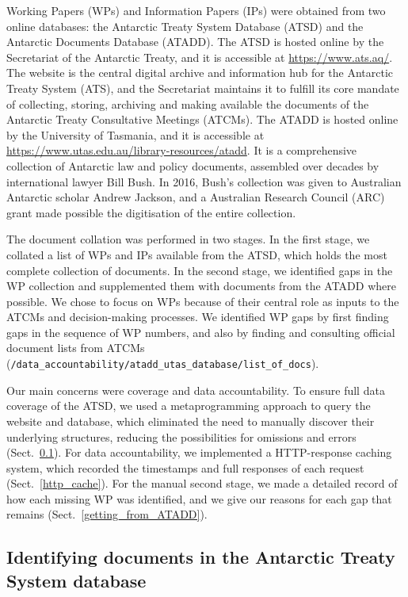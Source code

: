 \documentclass[12pt]{article}
\begin{document}
Working Papers (WPs) and Information Papers (IPs) were obtained from two online databases:
the Antarctic Treaty System Database (ATSD) and the Antarctic Documents Database (ATADD).
%
The ATSD is hosted online by the Secretariat of the Antarctic Treaty,
and it is accessible at \url{https://www.ats.aq/}.
The website is the central digital archive and information hub for the Antarctic Treaty System (ATS),
and the Secretariat maintains it to fulfill its core mandate 
of collecting, storing, archiving and making available the documents of the Antarctic Treaty Consultative Meetings (ATCMs).
%
The ATADD is hosted online by the University of Tasmania,
and it is accessible at \url{https://www.utas.edu.au/library-resources/atadd}.
It is a comprehensive collection of Antarctic law and policy documents, 
assembled over decades by international lawyer Bill Bush.
In 2016, Bush's collection was given to Australian Antarctic scholar Andrew Jackson, 
and a Australian Research Council (ARC) grant made possible the digitisation of the entire collection.

The document collation was performed in two stages.
In the first stage,
we collated a list of WPs and IPs available from the ATSD,
which holds the most complete collection of documents.
In the second stage,
we identified gaps in the WP collection and supplemented them with documents from the ATADD where possible.
We chose to focus on WPs because of their central role as inputs to the ATCMs and decision-making processes.
We identified WP gaps by first finding gaps in the sequence of WP numbers,
and also by finding and consulting official document lists from ATCMs 
({\tt /data\_accountability/atadd\_utas\_database/list\_of\_docs}).

Our main concerns were coverage and data accountability.
To ensure full data coverage of the ATSD,
we used a metaprogramming approach to query the website and database,
which eliminated the need to manually discover their underlying structures,
reducing the possibilities for omissions and errors (Sect.~\ref{getting_from_ATSD}).
For data accountability,
we implemented a HTTP-response caching system,
which recorded the timestamps and full responses of each request (Sect.~\ref{http_cache}).
For the manual second stage,
we made a detailed record of how each missing WP was identified,
and we give our reasons for each gap that remains (Sect.~\ref{getting_from_ATADD}).

\subsection{Identifying documents in the Antarctic Treaty System database}
\label{getting_from_ATSD}
\end{document}
